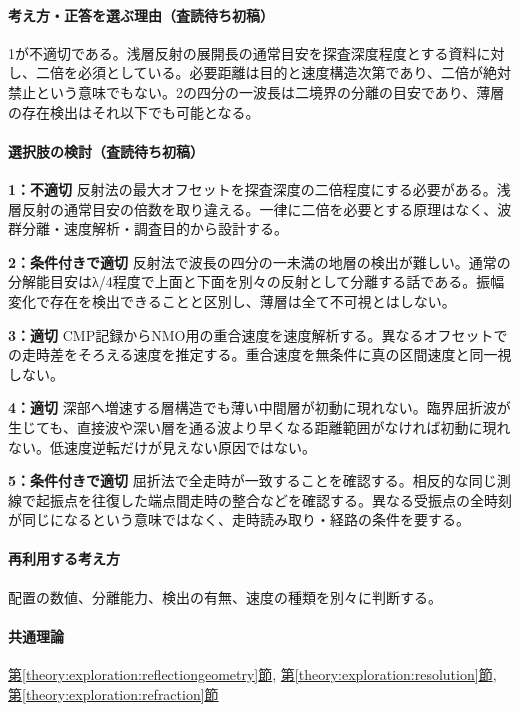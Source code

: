 \paragraph{考え方・正答を選ぶ理由（査読待ち初稿）} 1が不適切である。浅層反射の展開長の通常目安を探査深度程度とする資料に対し、二倍を必須としている。必要距離は目的と速度構造次第であり、二倍が絶対禁止という意味でもない。2の四分の一波長は二境界の分離の目安であり、薄層の存在検出はそれ以下でも可能となる。

\paragraph{選択肢の検討（査読待ち初稿）}\mbox{}\par

\noindent\textbf{1：不適切} 反射法の最大オフセットを探査深度の二倍程度にする必要がある。浅層反射の通常目安の倍数を取り違える。一律に二倍を必要とする原理はなく、波群分離・速度解析・調査目的から設計する。\par

\noindent\textbf{2：条件付きで適切} 反射法で波長の四分の一未満の地層の検出が難しい。通常の分解能目安はλ/4程度で上面と下面を別々の反射として分離する話である。振幅変化で存在を検出できることと区別し、薄層は全て不可視とはしない。\par

\noindent\textbf{3：適切} CMP記録からNMO用の重合速度を速度解析する。異なるオフセットでの走時差をそろえる速度を推定する。重合速度を無条件に真の区間速度と同一視しない。\par

\noindent\textbf{4：適切} 深部へ増速する層構造でも薄い中間層が初動に現れない。臨界屈折波が生じても、直接波や深い層を通る波より早くなる距離範囲がなければ初動に現れない。低速度逆転だけが見えない原因ではない。\par

\noindent\textbf{5：条件付きで適切} 屈折法で全走時が一致することを確認する。相反的な同じ測線で起振点を往復した端点間走時の整合などを確認する。異なる受振点の全時刻が同じになるという意味ではなく、走時読み取り・経路の条件を要する。\par

\paragraph{再利用する考え方} 配置の数値、分離能力、検出の有無、速度の種類を別々に判断する。

\paragraph{共通理論} \hyperref[theory:exploration:reflectiongeometry]{第\ref*{theory:exploration:reflectiongeometry}節}, \hyperref[theory:exploration:resolution]{第\ref*{theory:exploration:resolution}節}, \hyperref[theory:exploration:refraction]{第\ref*{theory:exploration:refraction}節}

